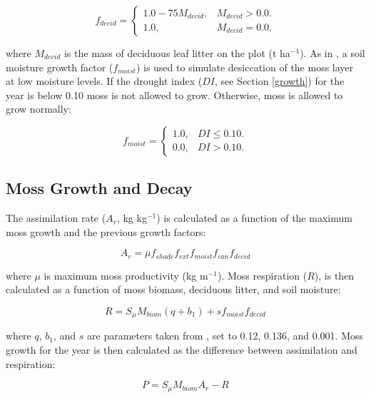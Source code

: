 \documentclass[a4paper, 12pt] {report}
\begin{document}
\begin{equation}
f_{decid} = \begin{cases}
1.0 - 75M_{decid}, & \text{$M_{decid} > 0.0$}.\\
1.0, & \text{$M_{decid} = 0.0$}.
\end{cases}
\end{equation}

where $M_{decid}$ is the mass of deciduous leaf litter on the plot (t ha$^{-1}$). As in , a soil moisture growth factor ($f_{moist}$) is used to simulate desiccation of the moss layer at low moisture levels. If the drought index ($DI$, see Section \ref{growth}) for the year is below 0.10 moss is not allowed to grow. Otherwise, moss is allowed to grow normally:

\begin{equation}
f_{moist} = \begin{cases}
1.0, & \text{$DI \leq 0.10$}.\\
0.0, & \text{$DI > 0.10$}.
\end{cases}
\end{equation}

\subsection{Moss Growth and Decay}

The assimilation rate ($A_r$, kg kg$^{-1}$) is calculated as a function of the maximum moss growth and the previous growth factors:

\begin{equation}
A_r = \mu f_{shade}f_{ext}f_{moist}f_{can}f_{decid}
\end{equation}

where $\mu$ is maximum moss productivity (kg m$^{-1}$). Moss respiration ($R$), is then calculated as a function of moss biomass, deciduous litter, and soil moisture:

\begin{equation}
R = S_\mu M_{biom}(q + b_1) + sf_{moist}f_{decid}
\end{equation}

where $q$, $b_1$, and $s$ are parameters taken from , set to 0.12, 0.136, and 0.001. Moss growth for the year is then calculated as the difference between assimilation and respiration:

\begin{equation}
P = S_\mu M_{biom}A_r - R
\end{equation}
\end{document}
